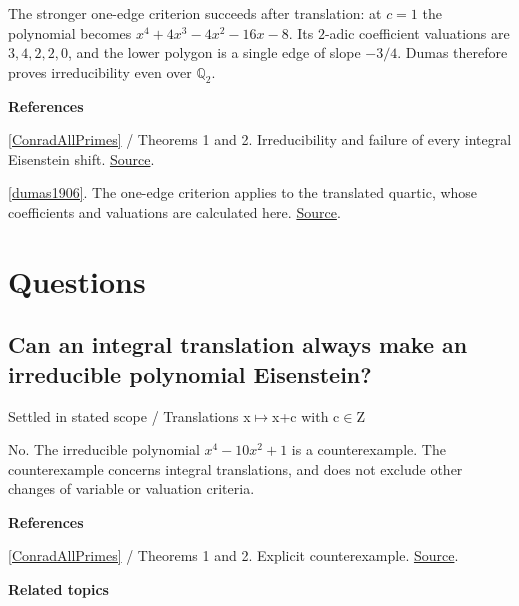 \documentclass[11pt,a4paper,oneside,openany]{book}
\newenvironment{sources}{\par\smallskip\begingroup\footnotesize\color{atlasgray}\leftskip=10pt\setlength{\parskip}{2pt}}{\par\endgroup\smallskip}
\begin{document}
\color{black} The stronger one-edge criterion succeeds after translation: at \(c=1\) the polynomial becomes \(x^4+4x^3-4x^2-16x-8\). Its \(2\)-adic coefficient valuations are \(3,4,2,2,0\), and the lower polygon is a single edge of slope \(-3/4\). Dumas therefore proves irreducibility even over \(\mathbb Q_2\).\par
\begin{sources}
\textbf{References}\par\smallskip
\noindent\hyperlink{ref:ConradAllPrimes}{[ConradAllPrimes]} / Theorems 1 and 2. Irreducibility and failure of every integral Eisenstein shift. \href{https://kconrad.math.uconn.edu/blurbs/ringtheory/reducibleallp.pdf}{Source}.\par
\noindent\hyperlink{ref:dumas1906}{[dumas1906]}. The one-edge criterion applies to the translated quartic, whose coefficients and valuations are calculated here. \href{https://www.numdam.org/item/JMPA_1906_6_2__191_0/}{Source}.\par
\end{sources}\color{black}
\section*{Questions}
\subsection*{Can an integral translation always make an irreducible polynomial Eisenstein?}
{\small\sffamily\color{atlasgold}Settled in stated scope / Translations x\ensuremath{\mapsto}x+c with c\ensuremath{\in}Z}\par\smallskip
\color{black} No. The irreducible polynomial \(x^4-10x^2+1\) is a counterexample. The counterexample concerns integral translations, and does not exclude other changes of variable or valuation criteria.\par
\begin{sources}
\textbf{References}\par\smallskip
\noindent\hyperlink{ref:ConradAllPrimes}{[ConradAllPrimes]} / Theorems 1 and 2. Explicit counterexample. \href{https://kconrad.math.uconn.edu/blurbs/ringtheory/reducibleallp.pdf}{Source}.\par
\end{sources}\color{black}
\par\medskip\begingroup\footnotesize\setlength{\parskip}{1pt}\textbf{\sffamily\color{atlasgreen}Related topics}\par
\end{document}
